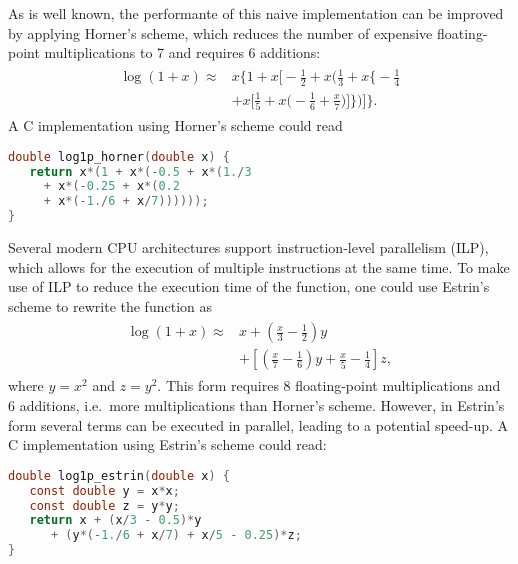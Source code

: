 \documentclass[10pt,DIV16,twocolumn]{scrartcl}
\begin{document}
As is well known, the performante of this naive implementation can be
improved by applying Horner's scheme, which reduces the number of
expensive floating-point multiplications to 7 and requires 6
additions:
%
\begin{align}
\begin{split}
  \log(1+x) \approx{}& x \Bigg\{1 + x \Bigg[-\frac{1}{2} + x \Bigg(\frac{1}{3} + x \Bigg\{-\frac{1}{4} \\
  &+ x \Bigg[\frac{1}{5} + x\Bigg(-\frac{1}{6} + \frac{x}{7}\Bigg)\Bigg]\Bigg\}\Bigg)\Bigg]\Bigg\}.
\end{split}\label{eq:horner}%
\end{align}
%
A C implementation using Horner's scheme could read
%
\begin{lstlisting}[language=C]
double log1p_horner(double x) {
   return x*(1 + x*(-0.5 + x*(1./3
     + x*(-0.25 + x*(0.2
     + x*(-1./6 + x/7))))));
}
\end{lstlisting}

Several modern CPU architectures support instruction-level parallelism
(ILP), which allows for the execution of multiple instructions at the
same time.  To make use of ILP to reduce the execution time of the
function, one could use Estrin's scheme \cite{estrin} to rewrite the
function as
%
\begin{align}
\begin{split}
  \log(1+x) \approx{}& x + \left(\frac{x}{3}-\frac{1}{2}\right)
    y \\ &+\left[\left(\frac{x}{7}-\frac{1}{6}\right)
    y+\frac{x}{5}-\frac{1}{4}\right] z,
\end{split}\label{eq:estrin}%
\end{align}
%
where $y=x^2$ and $z=y^2$.  This form requires 8 floating-point
multiplications and 6 additions, i.e.\ more multiplications than
Horner's scheme.  However, in Estrin's form several terms can be
executed in parallel, leading to a potential speed-up.  A C
implementation using Estrin's scheme could read:
%
\begin{lstlisting}[language=C]
double log1p_estrin(double x) {
   const double y = x*x;
   const double z = y*y;
   return x + (x/3 - 0.5)*y
      + (y*(-1./6 + x/7) + x/5 - 0.25)*z;
}
\end{lstlisting}
\end{document}
